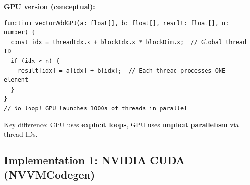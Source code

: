 \documentclass[11pt]{article}
\begin{document}
\textbf{GPU version (conceptual):}
\begin{lstlisting}[style=ts]
function vectorAddGPU(a: float[], b: float[], result: float[], n: number) {
  const idx = threadIdx.x + blockIdx.x * blockDim.x;  // Global thread ID
  if (idx < n) {
    result[idx] = a[idx] + b[idx];  // Each thread processes ONE element
  }
}
// No loop! GPU launches 1000s of threads in parallel
\end{lstlisting}

Key difference: CPU uses \textbf{explicit loops}, GPU uses \textbf{implicit parallelism} via thread IDs.

\subsection{Implementation 1: NVIDIA CUDA (NVVMCodegen)}
\end{document}
